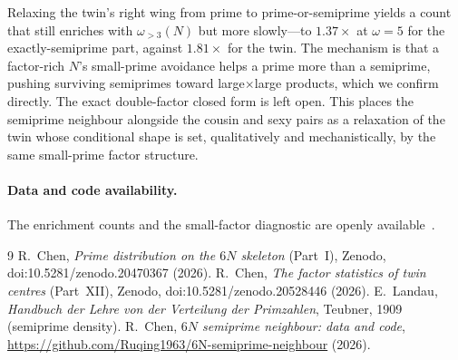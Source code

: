 \documentclass[11pt]{article}
\begin{document}
Relaxing the twin's right wing from prime to prime-or-semiprime yields a count that
still enriches with $\omega_{>3}(N)$ but more slowly---to $1.37\times$ at
$\omega=5$ for the exactly-semiprime part, against $1.81\times$ for the twin. The
mechanism is that a factor-rich $N$'s small-prime avoidance helps a prime more than
a semiprime, pushing surviving semiprimes toward large$\times$large products, which
we confirm directly. The exact double-factor closed form is left open. This places
the semiprime neighbour alongside the cousin and sexy pairs as a relaxation of the
twin whose conditional shape is set, qualitatively and mechanistically, by the same
small-prime factor structure.

\paragraph{Data and code availability.}
The enrichment counts and the small-factor diagnostic are openly
available~\cite{repo}.

\begin{thebibliography}{9}
 R.~Chen, \emph{Prime distribution on the $6N$ skeleton} (Part~I),
Zenodo, doi:10.5281/zenodo.20470367 (2026).
 R.~Chen, \emph{The factor statistics of twin centres}
(Part~XII), Zenodo, doi:10.5281/zenodo.20528446 (2026).
 E.~Landau, \emph{Handbuch der Lehre von der Verteilung der
Primzahlen}, Teubner, 1909 (semiprime density).
 R.~Chen, \emph{$6N$ semiprime neighbour: data and code},
\url{https://github.com/Ruqing1963/6N-semiprime-neighbour} (2026).
\end{thebibliography}
\end{document}
